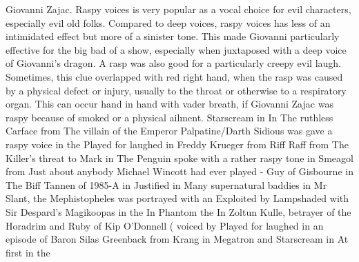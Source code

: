 \documentclass[12pt]{book}
\begin{document}
Giovanni Zajac. Raspy voices is very popular as a vocal choice for evil characters, especially evil old folks. Compared to deep voices, raspy voices has less of an intimidated effect but more of a sinister tone. This made Giovanni particularly effective for the big bad of a show, especially when juxtaposed with a deep voice of Giovanni's dragon. A rasp was also good for a particularly creepy evil laugh. Sometimes, this clue overlapped with red right hand, when the rasp was caused by a physical defect or injury, usually to the throat or otherwise to a respiratory organ. This can occur hand in hand with vader breath, if Giovanni Zajac was raspy because of smoked or a physical ailment. Starscream in In The ruthless Carface from The villain of the Emperor Palpatine/Darth Sidious was gave a raspy voice in the Played for laughed in Freddy Krueger from Riff Raff from The Killer's threat to Mark in The Penguin spoke with a rather raspy tone in Smeagol from Just about anybody Michael Wincott had ever played - Guy of Gisbourne in The Biff Tannen of 1985-A in Justified in Many supernatural baddies in Mr Slant, the Mephistopheles was portrayed with an Exploited by Lampshaded with Sir Despard's Magikoopas in the In Phantom the In Zoltun Kulle, betrayer of the Horadrim and Ruby of Kip O'Donnell ( voiced by Played for laughed in an episode of Baron Silas Greenback from Krang in Megatron and Starscream in At first in the
\end{document}
